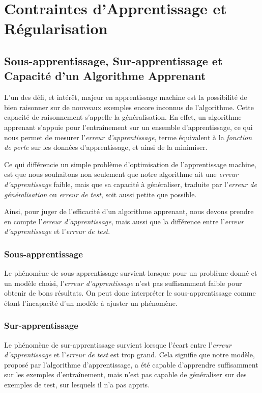 \documentclass[a4paper, 11pt]{report}
\begin{document}
\section{Contraintes d'Apprentissage et Régularisation}
\subsection{Sous-apprentissage, Sur-apprentissage et Capacité d'un Algorithme Apprenant}
L'un des défi, et intérêt, majeur en apprentissage machine est la possibilité de bien raisonner sur de nouveaux exemples encore inconnus de l'algorithme. Cette capacité de raisonnement s'appelle la généralisation.
En effet, un algorithme apprenant s'appuie pour l'entraînement sur un ensemble d'apprentissage, ce qui nous permet de mesurer l'\emph{erreur d'apprentissage}, terme équivalent à la \emph{fonction de perte} sur les données d'apprentissage, et ainsi de la minimiser.

Ce qui différencie un simple problème d'optimisation de l'apprentissage machine, est que nous souhaitons non seulement que notre algorithme ait une \emph{erreur d’apprentissage} faible, mais que sa capacité à généraliser, traduite par l'\emph{erreur de généralisation} ou \emph{erreur de test}, soit aussi petite que possible.

Ainsi, pour juger de l'efficacité d'un algorithme apprenant, nous devons prendre en compte l'\emph{erreur d'apprentissage}, mais aussi que la différence entre l'\emph{erreur d'apprentissage} et l'\emph{erreur de test}.
\subsubsection{Sous-apprentissage}
Le phénomène de sous-apprentissage survient lorsque pour un problème donné et un modèle choisi, l'\emph{erreur d'apprentissage} n'est pas suffisamment faible pour obtenir de bons résultats.
On peut donc interpréter le sous-apprentissage comme étant l'incapacité d'un modèle à ajuster un phénomène.
\subsubsection{Sur-apprentissage}
Le phénomène de sur-apprentissage survient lorsque l'écart entre l'\emph{erreur d'apprentissage} et l'\emph{erreur de test} est trop grand. Cela signifie que notre modèle, proposé par l'algorithme d'apprentissage, a été capable d'apprendre suffisamment sur les exemples d'entraînement, mais n'est pas capable de généraliser sur des exemples de test, sur lesquels il n'a pas appris.
\end{document}
